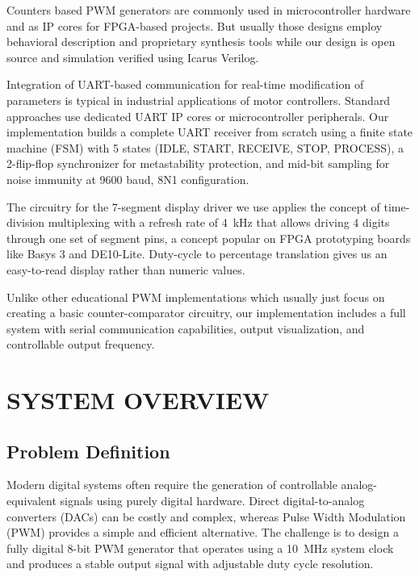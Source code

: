 \documentclass[12pt,a4paper]{article}
\begin{document}
Counters based PWM generators are commonly used in microcontroller hardware and as IP cores for FPGA-based projects. But usually those designs employ behavioral description and proprietary synthesis tools while our design is open source and simulation verified using Icarus Verilog.

Integration of UART-based communication for real-time modification of parameters is typical in industrial applications of motor controllers. Standard approaches use dedicated UART IP cores or microcontroller peripherals. Our implementation builds a complete UART receiver from scratch using a finite state machine (FSM) with 5 states (IDLE, START, RECEIVE, STOP, PROCESS), a 2-flip-flop synchronizer for metastability protection, and mid-bit sampling for noise immunity at 9600 baud, 8N1 configuration.

The circuitry for the 7-segment display driver we use applies the concept of time-division multiplexing with a refresh rate of 4~kHz that allows driving 4 digits through one set of segment pins, a concept popular on FPGA prototyping boards like Basys 3 and DE10-Lite. Duty-cycle to percentage translation gives us an easy-to-read display rather than numeric values.

Unlike other educational PWM implementations which usually just focus on creating a basic counter-comparator circuitry, our implementation includes a full system with serial communication capabilities, output visualization, and controllable output frequency.

\section{SYSTEM OVERVIEW}

\subsection{Problem Definition}
Modern digital systems often require the generation of controllable analog-equivalent signals using purely digital hardware. Direct digital-to-analog converters (DACs) can be costly and complex, whereas Pulse Width Modulation (PWM) provides a simple and efficient alternative. The challenge is to design a fully digital 8-bit PWM generator that operates using a 10~MHz system clock and produces a stable output signal with adjustable duty cycle resolution.
\end{document}
